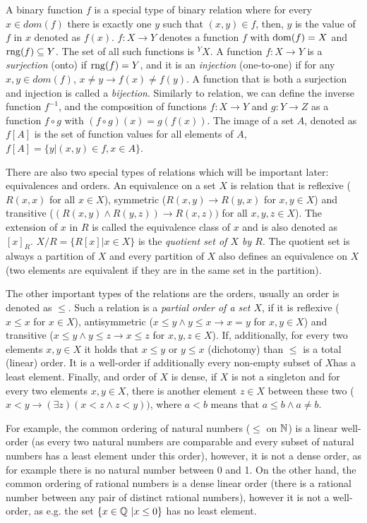 A binary function $f$ is a special type of binary relation where for every $x \in dom(f)$ there is exactly one $y$ such that $(x,y) \in f$, then, $y$ is the value of $f$ in $x$ denoted as $f(x)$. $f: X \to Y$ denotes a function $f$ with $\mathrm{dom}(f) = X$ and $\mathrm{rng}(f) \subseteq Y$. The set of all such functions is $^YX$. A function $f: X \to Y$ is a \emph{surjection} (onto) if $\mathrm{rng}(f)=Y$, and it is an \emph{injection} (one-to-one) if for any $x,y \in dom(f)$, $x \neq y \to f(x) \neq f(y)$. A function that is both a surjection and injection is called a \emph{bijection}. Similarly to relation, we can define the inverse function $f^{-1}$, and the composition of functions $f:X\to Y$ and $g:Y\to Z$ as a function $f \circ g$ with $(f \circ g)(x) = g(f(x))$. The image of a set $A$, denoted as $f[A]$ is the set of function values for all elements of $A$, $f[A] = \{y |(x,y) \in f, x \in A\}$.

There are also two special types of relations which will be important later: equivalences and orders. An equivalence on a set $X$ is relation that is reflexive ($R(x,x)$ for all $x\in X$), symmetric ($R(x,y) \to R(y,x)$ for $x,y \in X$) and transitive ($(R(x,y) \land R(y,z)) \to R(x,z))$ for all $x,y,z \in X$). The extension of $x$ in $R$ is called the equivalence class of $x$ and is also denoted as $[x]_R$. $X/R = \{R[x] | x \in X\}$ is the \emph{quotient set of $X$ by $R$}. The quotient set is always a partition of $X$ and every partition of $X$ also defines an equivalence on $X$ (two elements are equivalent if they are in the same set in the partition). 

The other important types of the relations are the orders, usually an order is denoted as $\leq$. Such a relation is a \emph{partial order of a set $X$}, if it is reflexive ($x \leq x$ for $x \in X$), antisymmetric ($x \leq y \land y \leq x \to x = y$ for $x,y\in X$) and transitive ($x \leq y \land y \leq z \to x \leq z$ for $x,y,z \in X$). If, additionally, for every two elements $x,y \in X$ it holds that $x \leq y$ or $y \leq x$ (dichotomy) than $\leq$ is a total (linear) order. It is a well-order if additionally every non-empty subset of $X$has a least element. Finally, and order of $X$ is dense, if $X$ is not a singleton and for every two elements $x,y \in X$, there is another element $z \in X$ between these two ($x < y \to (\exists z) (x < z \land z < y))$, where $a < b$ means that $a \leq b \land a \neq b$. 

For example, the common ordering of natural numbers ($\leq$ on $\mathbb{N}$) is a linear well-order (as every two natural numbers are comparable and every subset of natural numbers has a least element under this order), however, it is not a dense order, as for example there is no natural number between 0 and 1. On the other hand, the common ordering of rational numbers is a dense linear order (there is a rational number between any pair of distinct rational numbers), however it is not a well-order, as e.g. the set $\{x \in \mathbb{Q}\ | x \leq 0\}$ has no least element.

